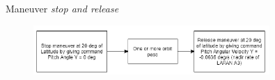 \documentclass[8pt]{beamer}
\begin{document}
\begin{frame}
\begin{columns}[T]
\begin{block}{Maneuver \textit{stop and release}}
\begin{figure}
      \end{figure}
      \begin{figure}
          \includegraphics[width=0.8\textwidth]{figure/exmaneuver1.png}
      \end{figure}
    \end{block}
  \end{columns}
\end{frame}
\end{document}
